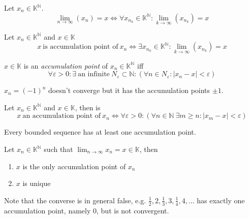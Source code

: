 \begin{theorem}\label{thm:all_subseq_conv}
   Let \(x_n \in \mathbb{K}^\mathbb{N}\).
   \[\lim_{n \to \infty}(x_n) = x \iff \forall x_{n_k} \in \mathbb{K}^\mathbb{N}: \lim_{k \to \infty}(x_{n_k}) = x\]
\end{theorem}

\begin{theorem}\label{thm:cp_iff_subseq}
   Let \(x_n \in \mathbb{K}^\mathbb{N}\) and \(x \in \mathbb{K}\)
   \[x~\text{is accumulation point of}~x_n \iff \exists x_{n_k} \in \mathbb{K}^\mathbb{N}: \lim_{k \to \infty}(x_{n_k}) = x\]
\end{theorem}

\begin{definition}
   \(x \in \mathbb{K}\) is an \emph{accumulation point} of \(x_n \in \mathbb{K}^\mathbb{N}\) iff
   \[\forall \varepsilon > 0: \exists~\text{an infinite}~N_{\varepsilon} \subset \mathbb{N}: (\forall n \in N_\varepsilon: |x_n - x| < \varepsilon)\]
\end{definition}
\begin{example}
   \(x_n = (-1)^n\) doesn't converge but it has the accumulation points \(\pm 1\).
\end{example}

\begin{theorem}
   Let \(x_n \in \mathbb{K}^\mathbb{N}\) and \(x \in \mathbb{K}\), then is
   \[x~\text{an accumulation point of}~x_n \iff \forall \varepsilon > 0: (\forall n \in \mathbb{N}~\exists m \geq n: |x_m - x| < \varepsilon)\]
\end{theorem}

\begin{theorem}\label{thm:bolzano}
   Every bounded sequence has at least one accumulation point.
\end{theorem}

\begin{theorem}
   Let \(x_n \in \mathbb{K}^\mathbb{N}\) such that \(\lim_{n \to \infty} x_n = x \in \mathbb{K}\), then
   \begin{enumerate}[label=\roman*, align=Center]
      \item \(x\) is the only accumulation point of \(x_n\)
      \item \(x\) is unique
   \end{enumerate}
\end{theorem}
\begin{remark}
   Note that the converse is in general false, e.g. \(\frac{1}{2}, 2, \frac{1}{3}, 3, \frac{1}{4}, 4, \ldots\) has exactly one accumulation point, namely 0, but is not convergent.
\end{remark}

